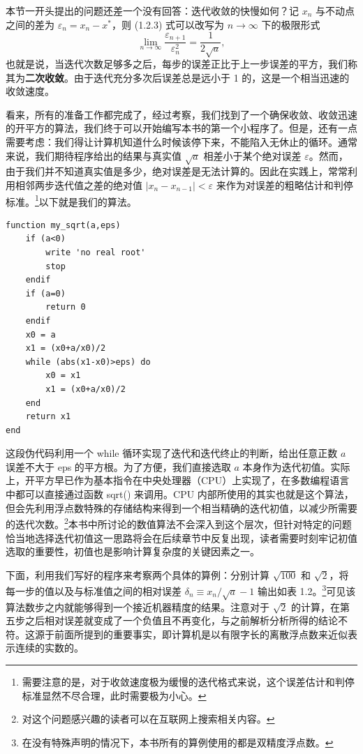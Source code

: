 本节一开头提出的问题还差一个没有回答：迭代收敛的快慢如何？记 $x_n$ 与不动点之间的差为 $\varepsilon_n=x_n-x^*$，则 (1.2.3) 式可以改写为 $n\to\infty$ 下的极限形式
\begin{equation}
 \lim_{n\to\infty}\frac{\varepsilon_{n+1}}{\varepsilon_n^2}=\frac{1}{2\sqrt a},
\tag{1.2.4}
\end{equation}
也就是说，当迭代次数足够多之后，每步的误差正比于上一步误差的平方，我们称其为\textbf{二次收敛}。由于迭代充分多次后误差总是远小于 1 的，这是一个相当迅速的收敛速度。

看来，所有的准备工作都完成了，经过考察，我们找到了一个确保收敛、收敛迅速的开平方的算法，我们终于可以开始编写本书的第一个小程序了。但是，还有一点需要考虑：我们得让计算机知道什么时候该停下来，不能陷入无休止的循环。通常来说，我们期待程序给出的结果与真实值 $\sqrt a$ 相差小于某个绝对误差 $\varepsilon$。然而，由于我们并不知道真实值是多少，绝对误差是无法计算的。因此在实践上，常常利用相邻两步迭代值之差的绝对值 $|x_n-x_{n-1}|<\varepsilon$ 来作为对误差的粗略估计和判停标准。\footnote{需要注意的是，对于收敛速度极为缓慢的迭代格式来说，这个误差估计和判停标准显然不尽合理，此时需要极为小心。}以下就是我们的算法。

\begin{algorithmBox}
\begin{lstlisting}[style=bellacode]
function my_sqrt(a,eps)
    if (a<0)
        write 'no real root'
        stop
    endif
    if (a=0)
        return 0
    endif
    x0 = a
    x1 = (x0+a/x0)/2
    while (abs(x1-x0)>eps) do
        x0 = x1
        x1 = (x0+a/x0)/2
    end
    return x1
end
\end{lstlisting}
\end{algorithmBox}

这段伪代码利用一个 while 循环实现了迭代和迭代终止的判断，给出任意正数 $a$ 误差不大于 eps 的平方根。为了方便，我们直接选取 $a$ 本身作为迭代初值。实际上，开平方早已作为基本指令在中央处理器（CPU）上实现了，在多数编程语言中都可以直接通过函数 sqrt() 来调用。CPU 内部所使用的其实也就是这个算法，但会先利用浮点数特殊的存储结构来得到一个相当精确的迭代初值，以减少所需要的迭代次数。\footnote{对这个问题感兴趣的读者可以在互联网上搜索相关内容。}本书中所讨论的数值算法不会深入到这个层次，但针对特定的问题恰当地选择迭代初值这一思路将会在后续章节中反复出现，读者需要时刻牢记初值选取的重要性，初值也是影响计算复杂度的关键因素之一。

下面，利用我们写好的程序来考察两个具体的算例：分别计算 $\sqrt{100}$ 和 $\sqrt2$，将每一步的值以及与标准值之间的相对误差 $\delta_n\equiv x_n/\sqrt a-1$ 输出如表 1.2。\footnote{在没有特殊声明的情况下，本书所有的算例使用的都是双精度浮点数。}可见该算法数步之内就能够得到一个接近机器精度的结果。注意对于 $\sqrt2$ 的计算，在第五步之后相对误差就变成了一个负值且不再变化，与之前解析分析所得的结论不符。这源于前面所提到的重要事实，即计算机是以有限字长的离散浮点数来近似表示连续的实数的。

